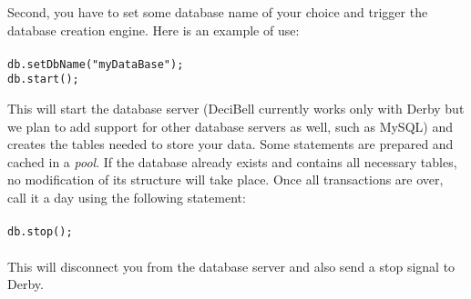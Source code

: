 \documentclass[a4paper,10pt]{article}
\begin{document}
Second, you have to set some database name of your choice and trigger the database 
creation engine. Here is an example of use:
\texttt{\\\\db.setDbName("myDataBase");\\db.start();\\ }

This will start the database server (DeciBell currently works only with Derby but we plan to 
add support for other database servers as well, such as MySQL) and creates the tables 
needed to store your data. Some statements are prepared and cached in a \emph{pool}. If the 
database already exists and contains all necessary tables, no modification of its structure 
will take place. Once all transactions are over, call it a day using the following statement:
\texttt{\\\\db.stop();\\ }\\
\noindent
This will disconnect you from the database server and also send a stop signal to Derby.
\end{document}
